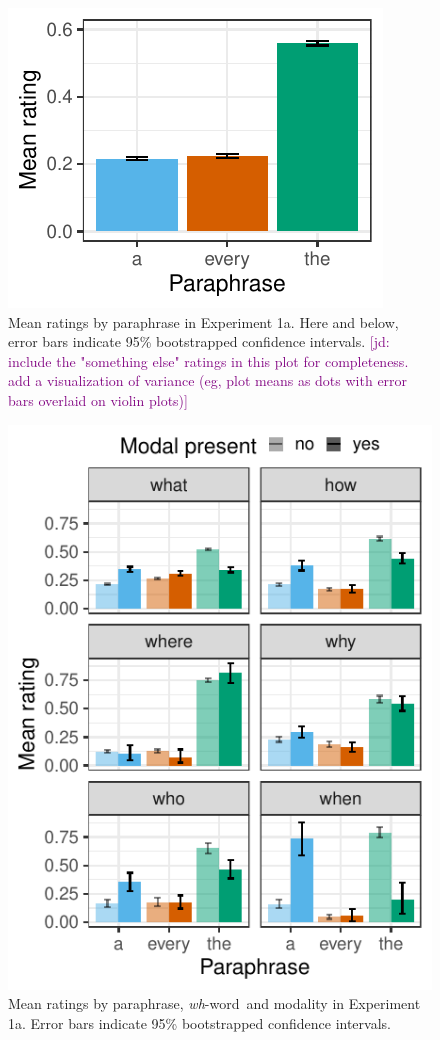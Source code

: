\documentclass[12pt,letterpaper,table,svgnames,dvipsnames]{article}
\newcommand{\jd}[1]{\textcolor{Purple}{[jd: #1]}}
\newcommand{\whw}{\emph{wh}-word~}
\begin{document}
\begin{figure}[h!]
\centering
\centering
\includegraphics[scale=1]{figures/overall_rq_context.pdf}
\caption{Mean ratings by paraphrase in Experiment 1a. Here and below, error bars indicate 95\% bootstrapped confidence intervals. \jd{include the "something else" ratings in this plot for completeness. add a visualization of variance (eg, plot means as dots with error bars overlaid on violin plots)}}
\label{ex1a_overall}
\end{figure}


\begin{figure}[h!]
\centering
\includegraphics[scale=1]{figures/modxwh_rq_context.pdf}
\caption{Mean ratings by paraphrase, \whw and modality in Experiment 1a. Error bars indicate 95\% bootstrapped confidence intervals.} 
\label{ex1a_modXwh}
\end{figure}
\end{document}
